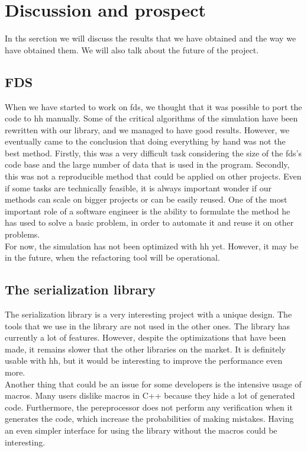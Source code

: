 
\clearpage
\section{Discussion and prospect}

In ths serction we will discuss the results that we have obtained and the way we
have obtained them. We will also talk about the future of the project.

\subsection{FDS}

When we have started to work on \gls{fds}, we thought that it was possible to
port the code to \gls{hh} manually. Some of the critical algorithms of the
simulation have been rewritten with our library, and we managed to have good
results. However, we eventually came to the conclusion that doing everything by
hand was not the best method. Firstly, this was a very difficult task
considering the size of the \gls{fds}'s code base and the large number of data
that is used in the program. Secondly, this was not a reproducible method that
could be applied on other projects. Even if some tasks are technically feasible,
it is always important wonder if our methods can scale on bigger projects or can
be easily reused. One of the most important role of a software engineer is the
ability to formulate the method he has used to solve a basic problem, in order
to automate it and reuse it on other problems.\\

For now, the simulation has not been optimized with \gls{hh} yet. However, it
may be in the future, when the refactoring tool will be operational.

\subsection{The serialization library}

The serialization library is a very interesting project with a unique design.
The tools that we use in the library are not used in the other ones. The library
has currently a lot of features. However, despite the optimizations that have
been made, it remains slower that the other libraries on the market. It is
definitely usable with \gls{hh}, but it would be interesting to improve the
performance even more.\\

Another thing that could be an issue for some developers is the intensive usage
of macros. Many users dislike macros in C++ because they hide a lot of generated
code. Furthermore, the pereprocessor does not perform any verification when it
generates the code, which increase the probabilities of making mistakes. Having
an even simpler interface for using the library without the macros could be
interesting.

